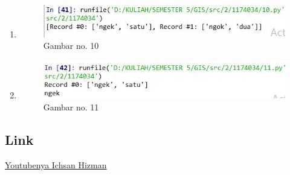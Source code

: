 \begin{enumerate}
    \item 
	
	\begin{figure}[H]
		\includegraphics[width=12cm]{figures/1174034/tugas3/10.PNG}
		\centering
		\caption{Gambar no. 10}
	\end{figure}

	\item 
	
	\begin{figure}[H]
		\includegraphics[width=12cm]{figures/1174034/tugas3/11.PNG}
		\centering
		\caption{Gambar no. 11}
	\end{figure}
\end{enumerate}

\subsection{Link}
\href{https://youtu.be/6CQ-dYhte20}{Youtubenya Ichsan Hizman}